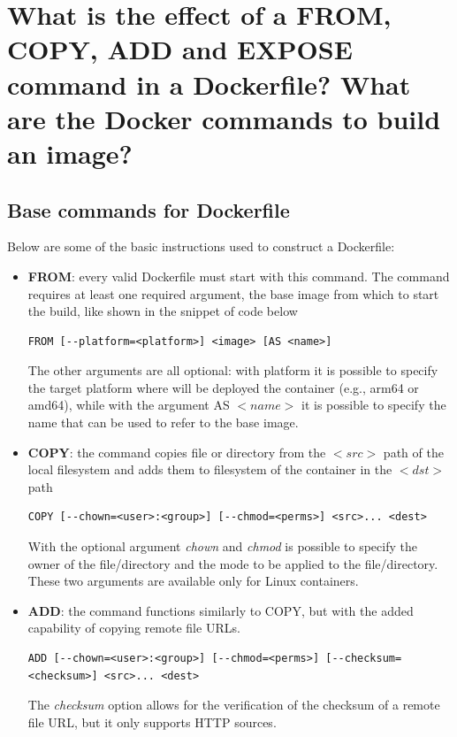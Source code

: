 \section{What is the effect of a FROM, COPY, ADD and EXPOSE command in a Dockerfile? What are the Docker commands to build an image?}
\subsection{Base commands for Dockerfile}
Below are some of the basic instructions used to construct a Dockerfile:
\begin{itemize}
   \item \textbf{FROM}: every valid Dockerfile must start with this command. The command requires at least one required argument, the base image from which to start the build, like shown in the snippet of code below
         \begin{verbatim}
FROM [--platform=<platform>] <image> [AS <name>]
    \end{verbatim}
         The other arguments are all optional: with platform it is possible to specify the target platform where will be deployed the container (e.g., arm64 or amd64), while with the argument AS $<name>$ it is possible to specify the name that can be used to refer to the base image.
   \item \textbf{COPY}: the command copies file or directory from the $<src>$ path of the local filesystem and adds them to filesystem of the container in the $<dst>$ path
         \begin{verbatim}
COPY [--chown=<user>:<group>] [--chmod=<perms>] <src>... <dest>
    \end{verbatim}
         With the optional argument \textit{chown} and \textit{chmod} is possible to specify the owner of the file/directory and the mode to be applied to the file/directory. These two arguments are available only for Linux containers.
   \item \textbf{ADD}: the command functions similarly to COPY, but with the added capability of copying remote file URLs.
         \begin{verbatim}
ADD [--chown=<user>:<group>] [--chmod=<perms>] [--checksum=<checksum>] <src>... <dest>
    \end{verbatim}
         The \textit{checksum} option allows for the verification of the checksum of a remote file URL, but it only supports HTTP sources.

\end{itemize}
